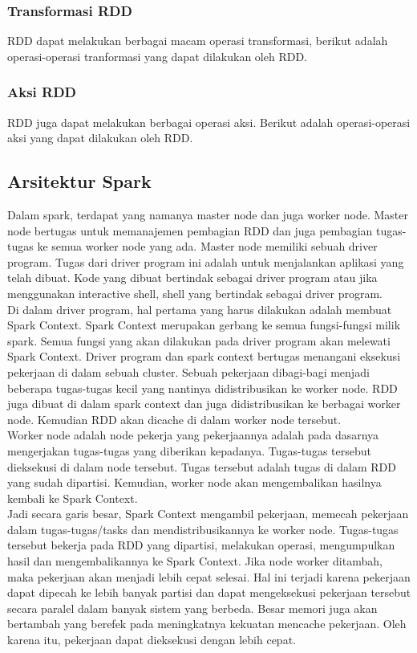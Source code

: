 \subsubsection{Transformasi RDD}
RDD dapat melakukan berbagai macam operasi transformasi, berikut adalah operasi-operasi tranformasi yang dapat dilakukan oleh RDD.

\subsubsection{Aksi RDD}
RDD juga dapat melakukan berbagai operasi aksi. Berikut adalah operasi-operasi aksi yang dapat dilakukan oleh RDD.

\subsection{Arsitektur Spark}
Dalam spark, terdapat yang namanya master node dan juga worker node. Master node bertugas untuk memanajemen pembagian RDD dan juga pembagian tugas-tugas ke semua worker node yang ada. Master node memiliki sebuah driver program. Tugas dari driver program ini adalah untuk menjalankan aplikasi yang telah dibuat. Kode yang dibuat bertindak sebagai driver program atau jika menggunakan interactive shell, shell yang bertindak sebagai driver program. \\
Di dalam driver program, hal pertama yang harus dilakukan adalah membuat Spark Context. Spark Context merupakan gerbang ke semua fungsi-fungsi milik spark. Semua fungsi yang akan dilakukan pada driver program akan melewati Spark Context. Driver program dan spark context bertugas menangani eksekusi pekerjaan di dalam sebuah cluster. Sebuah pekerjaan dibagi-bagi menjadi beberapa tugas-tugas kecil yang nantinya didistribusikan ke worker node. RDD juga dibuat di dalam spark context dan juga didistribusikan ke berbagai worker node. Kemudian RDD akan dicache di dalam worker node tersebut.\\
Worker node adalah node pekerja yang pekerjaannya adalah pada dasarnya mengerjakan tugas-tugas yang diberikan kepadanya. Tugas-tugas tersebut dieksekusi di dalam node tersebut. Tugas tersebut adalah tugas di dalam RDD yang sudah dipartisi. Kemudian, worker node  akan mengembalikan hasilnya kembali ke Spark Context.\\
Jadi secara garis besar, Spark Context mengambil pekerjaan, memecah pekerjaan dalam tugas-tugas/tasks dan mendistribusikannya ke worker node. Tugas-tugas tersebut bekerja pada RDD yang dipartisi, melakukan operasi, mengumpulkan hasil dan mengembalikannya ke Spark Context. 
Jika node worker ditambah, maka pekerjaan akan menjadi lebih cepat selesai. Hal ini terjadi karena pekerjaan dapat dipecah ke lebih banyak partisi dan dapat mengeksekusi pekerjaan tersebut secara paralel dalam banyak sistem yang berbeda. Besar memori juga akan bertambah yang berefek pada meningkatnya kekuatan mencache pekerjaan.
Oleh karena itu, pekerjaan dapat dieksekusi dengan lebih cepat.


